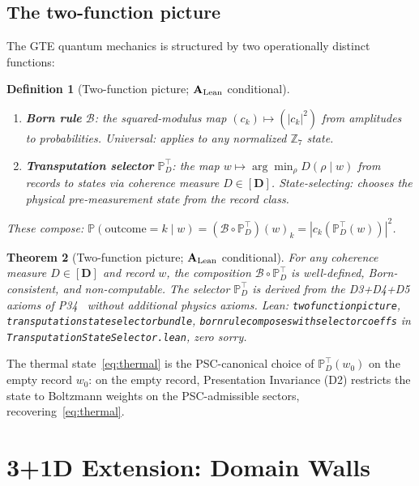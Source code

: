 \documentclass[11pt]{article}
\newtheorem{theorem}{Theorem}[section]
\newtheorem{definition}[theorem]{Definition}
\theoremstyle{remark}
\newcommand{\ZS}{\mathbb{Z}_7}
\newcommand{\lean}[1]{%
  \penalty-100
  \begingroup\def\_{\textunderscore\allowbreak}\texttt{#1}\endgroup}
\newcommand{\CatAL}{\ensuremath{\textbf{A}_{\rm Lean}}}
\begin{document}
\subsection{The two-function picture}
\label{ssec:two_function}

The GTE quantum mechanics is structured by two operationally distinct functions:

\begin{definition}[Two-function picture; $\CatAL$ conditional]
  \label{def:two_function}
  \begin{enumerate}[noitemsep]
    \item \textbf{Born rule} $\mathcal{B}$: the squared-modulus map
      $(c_k)\mapsto(|c_k|^2)$ from amplitudes to probabilities.  \emph{Universal}:
      applies to any normalized $\ZS$ state.
    \item \textbf{Transputation selector} $\mathbb{P}^\top_D$: the map
      $w \mapsto \arg\min_\rho D(\rho\mid w)$ from records to states via
      coherence measure $D\in[\mathbf{D}]$.  \emph{State-selecting}:
      chooses the physical pre-measurement state from the record class.
  \end{enumerate}
  These compose: $\mathbb{P}(\text{outcome}=k\mid w) = (\mathcal{B}\circ\mathbb{P}^\top_D)(w)_k = |c_k(\mathbb{P}^\top_D(w))|^2$.
\end{definition}

\begin{theorem}[Two-function picture; $\CatAL$ conditional]
  \label{thm:two_function}
  For any coherence measure $D\in[\mathbf{D}]$ and record $w$, the composition
  $\mathcal{B}\circ\mathbb{P}^\top_D$ is well-defined, Born-consistent, and
  non-computable.  The selector $\mathbb{P}^\top_D$ is derived from the
  D3+D4+D5 axioms of P34~\cite{SpivackGTEMobius} without additional
  physics axioms.
  Lean: \lean{two\_function\_picture},
  \lean{transputation\_state\_selector\_bundle},
  \lean{born\_rule\_composes\_with\_selector\_coeffs}
  in \lean{TransputationStateSelector.lean}, zero sorry.
\end{theorem}

The thermal state~\eqref{eq:thermal} is the PSC-canonical choice of
$\mathbb{P}^\top_D(w_0)$ on the empty record $w_0$: on the empty record,
Presentation Invariance (D2) restricts the state to Boltzmann weights on
the PSC-admissible sectors, recovering~\eqref{eq:thermal}.

\section{3+1D Extension: Domain Walls}
\label{sec:3d}
\end{document}
